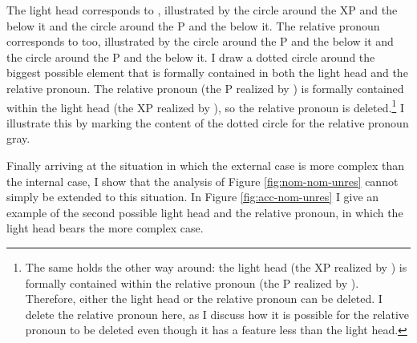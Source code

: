 The light head corresponds to , illustrated by the circle around the XP and the  below it and the circle around the P and the  below it. The relative pronoun corresponds to  too, illustrated by the circle around the P and the  below it and the circle around the P and the  below it.
I draw a dotted circle around the biggest possible element that is formally contained in both the light head and the relative pronoun.
The relative pronoun (the P realized by ) is formally contained within the light head (the XP realized by ), so the relative pronoun is deleted.\footnote{
The same holds the other way around: the light head (the XP realized by ) is formally contained within the relative pronoun (the P realized by ). Therefore, either the light head or the relative pronoun can be deleted. I delete the relative pronoun here, as I discuss how it is possible for the relative pronoun to be deleted even though it has a feature less than the light head.
}
I illustrate this by marking the content of the dotted circle for the relative pronoun gray.

Finally arriving at the situation in which the external case is more complex than the internal case, I show that the analysis of Figure \ref{fig:nom-nom-unres} cannot simply be extended to this situation.
In Figure \ref{fig:acc-nom-unres} I give an example of the second possible light head and the relative pronoun, in which the light head bears the more complex case.

